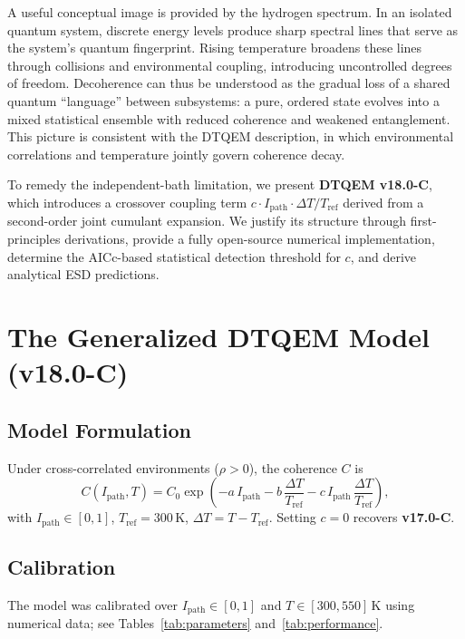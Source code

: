 \documentclass[reprint,amsmath,amssymb,aps,pra,superscriptaddress]{revtex4-2}
\begin{document}
A useful conceptual image is provided by the hydrogen spectrum. In an isolated
quantum system, discrete energy levels produce sharp spectral lines that serve
as the system's quantum fingerprint. Rising temperature broadens these lines
through collisions and environmental coupling, introducing uncontrolled degrees
of freedom. Decoherence can thus be understood as the gradual loss of a shared
quantum ``language'' between subsystems: a pure, ordered state evolves into a
mixed statistical ensemble with reduced coherence and weakened entanglement.
This picture is consistent with the DTQEM description, in which environmental
correlations and temperature jointly govern coherence decay.

To remedy the independent-bath limitation, we present
\textbf{DTQEM v18.0-C}, which introduces a crossover coupling term
$c\cdot I_{\text{path}}\cdot\Delta T/T_{\text{ref}}$ derived from a
second-order joint cumulant expansion. We justify its structure through
first-principles derivations, provide a fully open-source numerical
implementation, determine the AICc-based statistical detection threshold
for $c$, and derive analytical ESD predictions.

\section{The Generalized DTQEM Model (v18.0-C)}
\subsection{Model Formulation}
Under cross-correlated environments ($\rho>0$), the coherence $C$ is
\begin{equation}
  C(I_{\text{path}},T)=C_0\exp\!\left(
    -a\,I_{\text{path}}-b\,\frac{\Delta T}{T_{\text{ref}}}
    -c\,I_{\text{path}}\,\frac{\Delta T}{T_{\text{ref}}}\right),
  \label{eq:v18}
\end{equation}
with $I_{\text{path}}\in[0,1]$, $T_{\text{ref}}=300\,\mathrm{K}$,
$\Delta T=T-T_{\text{ref}}$. Setting $c=0$ recovers \textbf{v17.0-C}.

\subsection{Calibration}
The model was calibrated over $I_{\text{path}}\in[0,1]$ and
$T\in[300,550]\,\mathrm{K}$ using numerical data; see Tables~\ref{tab:parameters}
and~\ref{tab:performance}.
\end{document}
